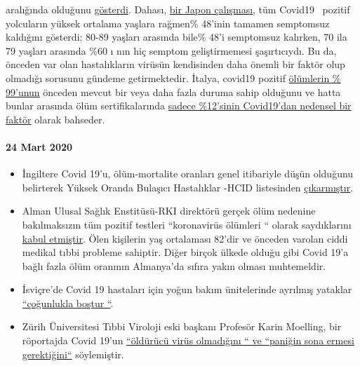 \begin{itemize}
  aralığında olduğunu
  \href{https://www.statnews.com/2020/03/17/a-fiasco-in-the-making-as-the-coronavirus-pandemic-takes-hold-we-are-making-decisions-without-reliable-data/}{gösterdi}.
  Dahası,
  \href{https://www.niid.go.jp/niid/en/2019-ncov-e/9407-covid-dp-fe-01.html}{bir
  Japon çalışması}, tüm Covid19~ pozitif yolcuların yüksek ortalama
  yaşlara rağmen\% 48'inin tamamen semptomsuz kaldığını gösterdi; 80-89
  yaşları arasında bile\% 48'i semptomsuz kalırken, 70 ila 79 yaşları
  arasında \%60 ı nın hiç semptom geliştirmemesi şaşırtıcıydı. Bu da,
  önceden var olan hastalıkların virüsün kendisinden daha önemli bir
  faktör olup olmadığı sorusunu gündeme getirmektedir. İtalya, covid19
  pozitif
  \href{https://www.bloomberg.com/news/articles/2020-03-18/99-of-those-who-died-from-virus-had-other-illness-italy-says}{ölümlerin
  \% 99'unun} önceden mevcut bir veya daha fazla duruma sahip olduğunu
  ve hatta bunlar arasında ölüm sertifikalarında
  \href{https://web.archive.org/web/20200324214448/https:/www.telegraph.co.uk/global-health/science-and-disease/have-many-coronavirus-patients-died-italy/}{sadece
  \%12'sinin Covid19'dan nedensel bir faktör} olarak bahseder.
\end{itemize}

\hypertarget{24-mart-2020}{%
\paragraph{24 Mart 2020}\label{24-mart-2020}}

\begin{itemize}
\tightlist
\item
  İngiltere Covid 19'u, ölüm-mortalite oranları genel itibariyle düşün
  olduğunu belirterek Yüksek Oranda Bulaşıcı Hastalıklar -HCID
  listesinden
  \href{https://www.radioeins.de/programm/sendungen/die_profis/archivierte_sendungen/beitraege/corona-virus-kein-killervirus.html}{çıkarmıştır}.
\item
  Alman Ulusal Sağlık Enstitüsü-RKI direktörü gerçek ölüm nedenine
  bakılmaksızın tüm pozitif testleri ``koronavirüs ölümleri `` olarak
  saydıklarını
  \href{https://swprs.org/rki-relativiert-corona-todesfaelle/}{kabul
  etmiştir}. Ölen kişilerin yaş ortalaması 82'dir ve önceden varolan
  ciddi medikal tıbbi probleme sahiptir. Diğer birçok ülkede olduğu gibi
  Covid 19'a bağlı fazla ölüm oranının Almanya'da sıfıra yakın olması
  muhtemeldir. 
\item
  İsviçre'de Covid 19 hastaları için yoğun bakım ünitelerinde ayrılmış
  yataklar
  \href{https://www.aargauerzeitung.ch/aargau/kanton-aargau/erst-3-von-100-aargauer-betten-der-intensivstationen-sind-belegt-so-ruesten-sich-die-spitaeler-auf-die-epidemie-137332716}{``çoğunlukla
  boştur ``}. 
\item
  Zürih Üniversitesi Tıbbi Viroloji eski başkanı Profesör Karin
  Moelling, bir röportajda Covid 19'un
  \href{https://www.radioeins.de/programm/sendungen/die_profis/archivierte_sendungen/beitraege/corona-virus-kein-killervirus.html}{``öldürücü
  virüs olmadığını `` ve ``paniğin sona ermesi gerektiğini``}
  söylemiştir.
\end{itemize}

